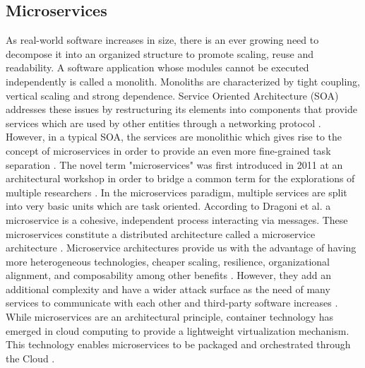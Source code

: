 \subsection{Microservices}
\label{chap:microservices}

As real-world software increases in size, there is an ever growing need to decompose it into an organized structure to promote scaling, reuse and readability. A software application whose modules cannot be executed independently is called a monolith. Monoliths are characterized by tight coupling, vertical scaling and strong dependence. Service Oriented Architecture (SOA) addresses these issues by restructuring its elements into components that provide services which are used by other entities through a networking protocol \cite{papazoglou2003service}. However, in a typical SOA, the services are monolithic which gives rise to the concept of microservices in order to provide an even more fine-grained task separation \cite{ahmadvand2016requirements}. The novel term "microservices" was first introduced in 2011 at an architectural workshop in order to bridge a common term for the explorations of multiple researchers \cite{dragoni2017microservices, microservicesfrowler}. In the microservices paradigm, multiple services are split into very basic units which are task oriented. According to Dragoni et al. a microservice is a cohesive, independent process interacting via messages. These microservices constitute a distributed architecture called a microservice architecture \cite{dragoni2017microservices}. Microservice architectures provide us with the advantage of having more heterogeneous technologies, cheaper scaling, resilience, organizational alignment, and composability among other benefits \cite{newman2015building}. However, they add an additional complexity and have a wider attack surface as the need of many services to communicate with each other and third-party software increases \cite{combe2016docker, dragoni2017microservices}. While microservices are an architectural principle, container technology has emerged in cloud computing to provide a lightweight virtualization mechanism. This technology enables microservices to be packaged and orchestrated through the Cloud \cite{pahl2016microservices}.

